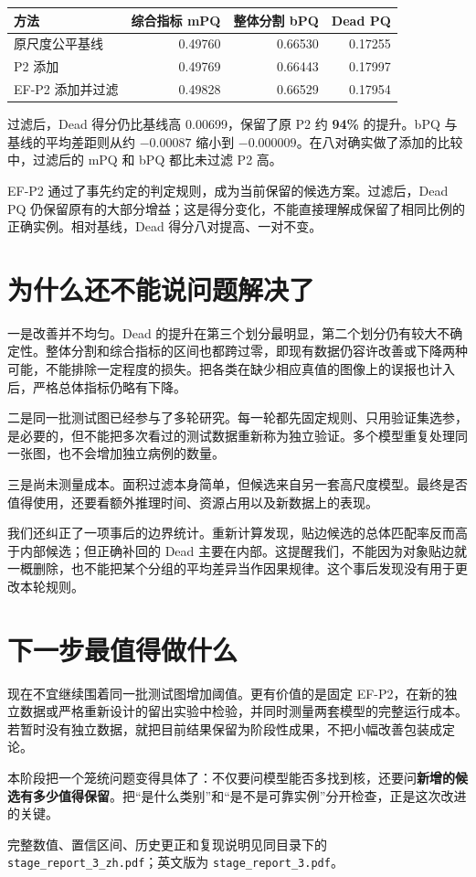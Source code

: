 \documentclass[12pt,a4paper]{article}
\begin{document}
\begin{center}
\begin{tabular}{lrrr}\toprule
方法 & 综合指标 mPQ & 整体分割 bPQ & Dead PQ\\\midrule
原尺度公平基线 & 0.49760 & 0.66530 & 0.17255\\
P2 添加 & 0.49769 & 0.66443 & 0.17997\\
EF-P2 添加并过滤 & 0.49828 & 0.66529 & 0.17954\\\bottomrule
\end{tabular}
\end{center}

过滤后，Dead 得分仍比基线高 0.00699，保留了原 P2 约 \textbf{94\%} 的提升。bPQ 与基线的平均差距则从约 $-0.00087$ 缩小到 $-0.000009$。在八对确实做了添加的比较中，过滤后的 mPQ 和 bPQ 都比未过滤 P2 高。

EF-P2 通过了事先约定的判定规则，成为当前保留的候选方案。过滤后，Dead PQ 仍保留原有的大部分增益；这是得分变化，不能直接理解成保留了相同比例的正确实例。相对基线，Dead 得分八对提高、一对不变。

\section*{为什么还不能说问题解决了}

一是改善并不均匀。Dead 的提升在第三个划分最明显，第二个划分仍有较大不确定性。整体分割和综合指标的区间也都跨过零，即现有数据仍容许改善或下降两种可能，不能排除一定程度的损失。把各类在缺少相应真值的图像上的误报也计入后，严格总体指标仍略有下降。

二是同一批测试图已经参与了多轮研究。每一轮都先固定规则、只用验证集选参，是必要的，但不能把多次看过的测试数据重新称为独立验证。多个模型重复处理同一张图，也不会增加独立病例的数量。

三是尚未测量成本。面积过滤本身简单，但候选来自另一套高尺度模型。最终是否值得使用，还要看额外推理时间、资源占用以及新数据上的表现。

我们还纠正了一项事后的边界统计。重新计算发现，贴边候选的总体匹配率反而高于内部候选；但正确补回的 Dead 主要在内部。这提醒我们，不能因为对象贴边就一概删除，也不能把某个分组的平均差异当作因果规律。这个事后发现没有用于更改本轮规则。

\section*{下一步最值得做什么}

现在不宜继续围着同一批测试图增加阈值。更有价值的是固定 EF-P2，在新的独立数据或严格重新设计的留出实验中检验，并同时测量两套模型的完整运行成本。若暂时没有独立数据，就把目前结果保留为阶段性成果，不把小幅改善包装成定论。

本阶段把一个笼统问题变得具体了：不仅要问模型能否多找到核，还要问\textbf{新增的候选有多少值得保留}。把“是什么类别”和“是不是可靠实例”分开检查，正是这次改进的关键。

\vspace{1em}
\noindent\small 完整数值、置信区间、历史更正和复现说明见同目录下的
\texttt{stage\_report\_3\_zh.pdf}；英文版为 \texttt{stage\_report\_3.pdf}。
\end{document}
